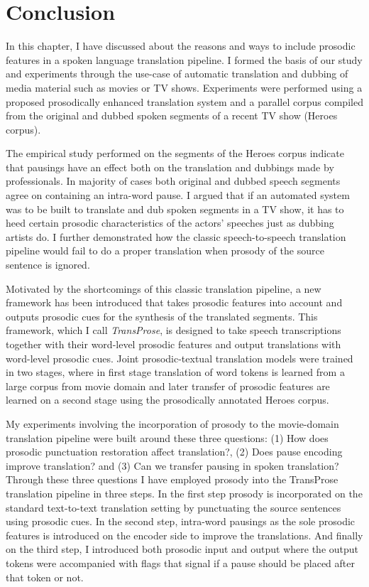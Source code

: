 
\section{Conclusion}

In this chapter, I have discussed about the reasons and ways to include prosodic features in a spoken language translation pipeline. I formed the basis of our study and experiments through the use-case of automatic translation and dubbing of media material such as movies or TV shows. Experiments were performed using a proposed prosodically enhanced translation system and a parallel corpus compiled from the original and dubbed spoken segments of a recent TV show (Heroes corpus). 

The empirical study performed on the segments of the Heroes corpus indicate that pausings have an effect both on the translation and dubbings made by professionals. In majority of cases both original and dubbed speech segments agree on containing an intra-word pause. I argued that if an automated system was to be built to translate and dub spoken segments in a TV show, it has to heed certain prosodic characteristics of the actors' speeches just as dubbing artists do. I further demonstrated how the classic speech-to-speech translation pipeline would fail to do a proper translation when prosody of the source sentence is ignored.

Motivated by the shortcomings of this classic translation pipeline, a new framework has been introduced that takes prosodic features into account and outputs prosodic cues for the synthesis of the translated segments. This framework, which I call \textit{TransProse}, is designed to take speech transcriptions together with their word-level prosodic features and output translations with word-level prosodic cues. Joint prosodic-textual translation models were trained in two stages, where in first stage translation of word tokens is learned from a large corpus from movie domain and later transfer of prosodic features are learned on a second stage using the prosodically annotated Heroes corpus.

My experiments involving the incorporation of prosody to the movie-domain translation pipeline were built around these three questions: (1) How does prosodic punctuation restoration affect translation?, (2) Does pause encoding improve translation? and (3) Can we transfer pausing in spoken translation? Through these three questions I have employed prosody into the TransProse translation pipeline in three steps. In the first step prosody is incorporated on the standard text-to-text translation setting by punctuating the source sentences using prosodic cues. In the second step, intra-word pausings as the sole prosodic features is introduced on the encoder side to improve the translations. And finally on the third step, I introduced both prosodic input and output where the output tokens were accompanied with flags that signal if a pause should be placed after that token or not.  

